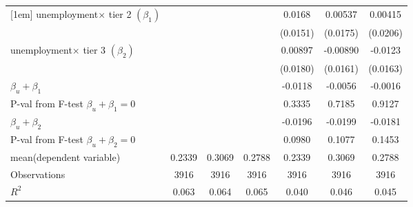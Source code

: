 \begin{table}[htbp]
\begin{adjustbox}{max width=0.8\textwidth}
\begin{tabular}{l*{6}{c}}
[1em]
unemployment$\times$ tier 2 $\left( \beta_1 \right)$&                     &                     &                     &      0.0168         &     0.00537         &     0.00415         \\
                    &                     &                     &                     &    (0.0151)         &    (0.0175)         &    (0.0206)         \\
[1em]
unemployment$\times$ tier 3 $\left( \beta_2 \right)$&                     &                     &                     &     0.00897         &    -0.00890         &     -0.0123         \\
                    &                     &                     &                     &    (0.0180)         &    (0.0161)         &    (0.0163)         \\
\hline
$\beta_u + \beta_1 $     &                 &                 &                 &        -0.0118         &        -0.0056         &        -0.0016         \\
P-val from F-test  $\beta_u + \beta_1=0 $   &                 &                 &                 &        0.3335         &        0.7185         &        0.9127         \\
$\beta_u + \beta_2$     &                 &                 &                 &        -0.0196        &        -0.0199       &        -0.0181    \\
P-val from F-test $\beta_u + \beta_2=0 $    &                 &                 &                 &        0.0980        &        0.1077         &        0.1453       \\
\hline
mean(dependent variable)        &     0.2339         &         0.3069          &        0.2788         &        0.2339          &         0.3069           &        0.2788         \\
\hline
Observations        &        3916         &        3916         &        3916         &        3916         &        3916         &        3916         \\
\(R^{2}\)           &       0.063         &       0.064         &       0.065         &       0.040         &       0.046         &       0.045         \\

\end{tabular}
\end{adjustbox}
\end{table}
